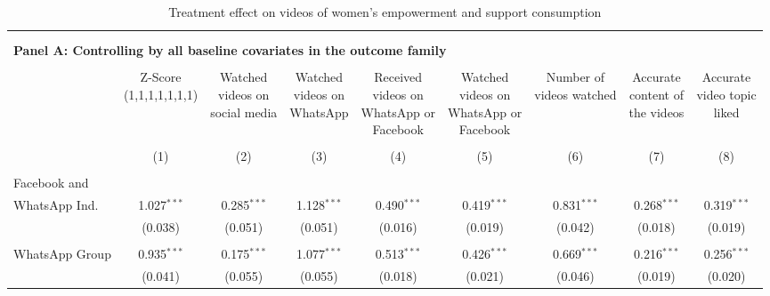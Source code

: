 \documentclass[12pt]{article}
\begin{document}
\begin{table}[H] \centering 
      \caption{Treatment effect on videos of women’s empowerment and support consumption} 
  \label{} 
\scriptsize 
\hspace*{-1cm}\begin{tabular}{@{\extracolsep{2pt}}lcccccccc} 
\hline \\[-1.8ex] 
\\[-0.5ex] 
\multicolumn{9}{l}{\textbf{Panel A: Controlling by all baseline covariates in the outcome family}} \\
\hline \\[-1ex] 
 & \shortstack{Z-Score \\ (1,1,1,1,1,1,1)} & \shortstack{Watched \\videos on \\social media} & \shortstack{Watched \\videos on\\ WhatsApp} & \shortstack{Received \\videos on \\WhatsApp or \\Facebook} & \shortstack{Watched \\videos on \\WhatsApp or \\Facebook} & \shortstack{Number of \\videos watched} & \shortstack{Accurate \\content of \\the videos} & \shortstack{Accurate \\video topic \\liked} \\ 
\\[-1.8ex] & (1) & (2) & (3) & (4) & (5) & (6) & (7) & (8)\\ 
\hline \\[-1.8ex] 
 Facebook and \\ WhatsApp Ind. & 1.027$^{***}$ & 0.285$^{***}$ & 1.128$^{***}$ & 0.490$^{***}$ & 0.419$^{***}$ & 0.831$^{***}$ & 0.268$^{***}$ & 0.319$^{***}$ \\ 
  & (0.038) & (0.051) & (0.051) & (0.016) & (0.019) & (0.042) & (0.018) & (0.019) \\ 
  & & & & & & & & \\ 
 WhatsApp Group & 0.935$^{***}$ & 0.175$^{***}$ & 1.077$^{***}$ & 0.513$^{***}$ & 0.426$^{***}$ & 0.669$^{***}$ & 0.216$^{***}$ & 0.256$^{***}$ \\ 
  & (0.041) & (0.055) & (0.055) & (0.018) & (0.021) & (0.046) & (0.019) & (0.020) \\ 

\end{tabular}
\end{table}
\end{document}
